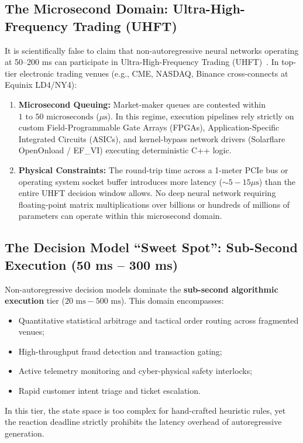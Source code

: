\documentclass[journal,compsoc]{IEEEtran}
\begin{document}
\subsection{The Microsecond Domain: Ultra-High-Frequency Trading (UHFT)}
It is scientifically false to claim that non-autoregressive neural networks operating at 50--200 ms can participate in Ultra-High-Frequency Trading (UHFT)~\cite{budish2015highfrequency}. In top-tier electronic trading venues (e.g., CME, NASDAQ, Binance cross-connects at Equinix LD4/NY4):
\begin{enumerate}
    \item \textbf{Microsecond Queuing:} Market-maker queues are contested within $1 \text{ to } 50 \text{ microseconds}$ ($\mu\text{s}$). In this regime, execution pipelines rely strictly on custom Field-Programmable Gate Arrays (FPGAs), Application-Specific Integrated Circuits (ASICs), and kernel-bypass network drivers (Solarflare OpenOnload / EF\_VI) executing deterministic C++ logic.
    \item \textbf{Physical Constraints:} The round-trip time across a 1-meter PCIe bus or operating system socket buffer introduces more latency ($\sim 5 - 15 \mu\text{s}$) than the entire UHFT decision window allows. No deep neural network requiring floating-point matrix multiplications over billions or hundreds of millions of parameters can operate within this microsecond domain.
\end{enumerate}

\subsection{The Decision Model ``Sweet Spot'': Sub-Second Execution (50 ms -- 300 ms)}
Non-autoregressive decision models dominate the \textbf{sub-second algorithmic execution} tier ($20 \text{ ms} - 500 \text{ ms}$). This domain encompasses:
\begin{itemize}
    \item Quantitative statistical arbitrage and tactical order routing across fragmented venues;
    \item High-throughput fraud detection and transaction gating;
    \item Active telemetry monitoring and cyber-physical safety interlocks;
    \item Rapid customer intent triage and ticket escalation.
\end{itemize}
In this tier, the state space is too complex for hand-crafted heuristic rules, yet the reaction deadline strictly prohibits the latency overhead of autoregressive generation.
\end{document}
